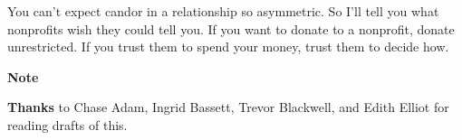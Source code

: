 You can't expect candor in a relationship so asymmetric. So I'll tell
you what nonprofits wish they could tell you. If you want to donate to a
nonprofit, donate unrestricted. If you trust them to spend your money,
trust them to decide how.

\textbf{Note}

\textbf{Thanks} to Chase Adam, Ingrid Bassett, Trevor Blackwell, and
Edith Elliot for reading drafts of this.